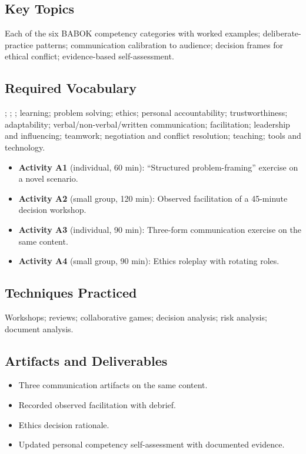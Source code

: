 \documentclass[11pt,letterpaper,oneside]{report}
\begin{document}
\subsection*{Key Topics}
Each of the six BABOK competency categories with worked examples; deliberate-practice patterns; communication calibration to audience; decision frames for ethical conflict; evidence-based self-assessment.

\subsection*{Required Vocabulary}
; ; ; learning; problem solving; ethics; personal accountability; trustworthiness; adaptability; verbal/non-verbal/written communication; facilitation; leadership and influencing; teamwork; negotiation and conflict resolution; teaching; tools and technology.

\begin{labbox}
\begin{itemize}
  \item \textbf{Activity A1} (individual, 60 min): ``Structured problem-framing'' exercise on a novel scenario.
  \item \textbf{Activity A2} (small group, 120 min): Observed facilitation of a 45-minute decision workshop.
  \item \textbf{Activity A3} (individual, 90 min): Three-form communication exercise on the same content.
  \item \textbf{Activity A4} (small group, 90 min): Ethics roleplay with rotating roles.
\end{itemize}
\end{labbox}

\subsection*{Techniques Practiced}
Workshops; reviews; collaborative games; decision analysis; risk analysis; document analysis.

\subsection*{Artifacts and Deliverables}
\begin{itemize}
  \item Three communication artifacts on the same content.
  \item Recorded observed facilitation with debrief.
  \item Ethics decision rationale.
  \item Updated personal competency self-assessment with documented evidence.
\end{itemize}
\end{document}
